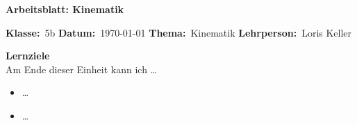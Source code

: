 \noprintanswers


\renewcommand{\solutiontitle}{\noindent\color{titleblue}\textbf{Lösung:}\enspace}

\pagestyle{headandfoot}

\newcommand{\Kopfzeile}[4]{%
  \begin{titlebox}
    {\color{white}\sffamily\bfseries\Large #4}
  \end{titlebox}
  \vspace{0.5em}
  \noindent\textbf{Klasse:}~#1 \hfill \textbf{Datum:}~#2 \hfill \textbf{Thema:}~#3
    \hfill \textbf{Lehrperson:}~Loris Keller
  \vspace{0.8em}
  \lhead{\textcolor{darkgray}{#3}}
  \rhead{\textcolor{darkgray}{#4}}
}

\newlength{\antwortraumlen}
\newcommand{\Antwortraum}[1]{%
  \pgfmathsetlength{\antwortraumlen}{#1*2.5cm}%
  \begin{answerbox}
    \rule{0pt}{\antwortraumlen}%
  \end{answerbox}%
}

\newcommand{\Klasse}{5b}
\newcommand{\Datum}{\today}
\newcommand{\Thema}{Kinematik}
\newcommand{\ArbeitsblattTitel}{Arbeitsblatt: Kinematik}



\Kopfzeile{\Klasse}{\Datum}{\Thema}{\ArbeitsblattTitel}

\begin{infobox}
\textbf{Lernziele}\\
Am Ende dieser Einheit kann ich \dots
\begin{itemize}[leftmargin=1.2cm,itemsep=0.25em]
  \item \dots
  \item \dots
\end{itemize}
\end{infobox}

